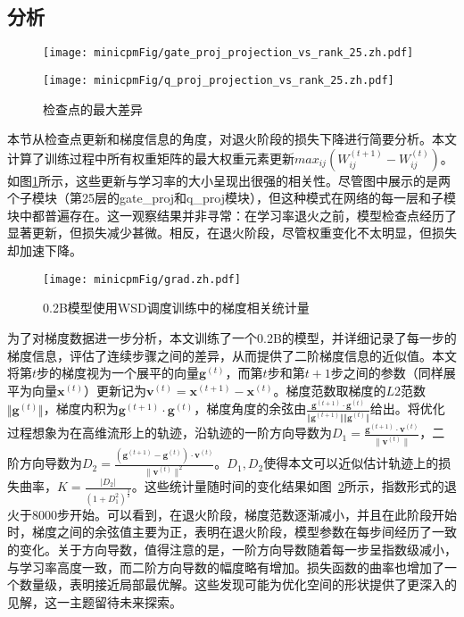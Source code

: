 \subsection{分析}
\begin{figure}[htbp]
    \centering
    \begin{minipage}[b]{0.7\linewidth}
        \centering
        \texttt{[image: minicpmFig/gate\_proj\_projection\_vs\_rank\_25.zh.pdf]}
    \end{minipage}
    \vspace{0.5cm} %
    \begin{minipage}[b]{0.7\linewidth}
        \centering
        \texttt{[image: minicpmFig/q\_proj\_projection\_vs\_rank\_25.zh.pdf]}
    \end{minipage}
    \caption{检查点的最大差异}
    \label{fig:appmaxdiff}
\end{figure}
本节从检查点更新和梯度信息的角度，对退火阶段的损失下降进行简要分析。本文计算了训练过程中所有权重矩阵的最大权重元素更新$max_{ij} (W_{ij}^{(t + 1)} - W_{ij}^{(t)})$。如图\ref{fig:appmaxdiff}所示，这些更新与学习率的大小呈现出很强的相关性。尽管图中展示的是两个子模块（第25层的gate\_proj和q\_proj模块），但这种模式在网络的每一层和子模块中都普遍存在。这一观察结果并非寻常：在学习率退火之前，模型检查点经历了显著更新，但损失减少甚微。相反，在退火阶段，尽管权重变化不太明显，但损失却加速下降。  




\begin{figure}[htbp]
    \centering
        \centering
        \texttt{[image: minicpmFig/grad.zh.pdf]}
     \caption{0.2B模型使用WSD调度训练中的梯度相关统计量}
        \label{fig:grad}
\end{figure}

为了对梯度数据进一步分析，本文训练了一个0.2B的模型，并详细记录了每一步的梯度信息，评估了连续步骤之间的差异，从而提供了二阶梯度信息的近似值。本文将第$t$步的梯度视为一个展平的向量$\mathbf{g}^{(t)}$，而第$t$步和第$t+1$步之间的参数（同样展平为向量$\mathbf{x}^{(t)}$）更新记为$\mathbf{v}^{(t)} = \mathbf{x}^{(t+1)} - \mathbf{x}^{(t)}$。梯度范数取梯度的$L2$范数$\Vert\mathbf{g}^{(t)} \Vert$，梯度内积为$\mathbf{g}^{(t+1)} \cdot \mathbf{g}^{(t)}$，梯度角度的余弦由$\frac{\mathbf{g}^{(t+1)} \cdot \mathbf{g}^{(t)}}  {\Vert\mathbf{g}^{(t+1)} \Vert \Vert\mathbf{g}^{(t)} \Vert}$给出。将优化过程想象为在高维流形上的轨迹，沿轨迹的一阶方向导数为$D_1 = \frac{\mathbf{g}^{(t+1)} \cdot \mathbf{v}^{(t)}}{\|\mathbf{v}^{(t)}\|}
$，二阶方向导数为$D_2 = \frac{(\mathbf{g}^{(t+1)} - \mathbf{g}^{(t)}) \cdot \mathbf{v}^{(t)}}{\|\mathbf{v}^{(t)}\|^2}
$。$D_1, D_2$使得本文可以近似估计轨迹上的损失曲率，$K = \frac{|D_2|}{(1 + D_1^2)^{\frac{3}{2}}}$。这些统计量随时间的变化结果如图~\ref{fig:grad}所示，指数形式的退火于8000步开始。可以看到，在退火阶段，梯度范数逐渐减小，并且在此阶段开始时，梯度之间的余弦值主要为正，表明在退火阶段，模型参数在每步间经历了一致的变化。关于方向导数，值得注意的是，一阶方向导数随着每一步呈指数级减小，与学习率高度一致，而二阶方向导数的幅度略有增加。损失函数的曲率也增加了一个数量级，表明接近局部最优解。这些发现可能为优化空间的形状提供了更深入的见解，这一主题留待未来探索。

